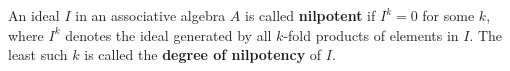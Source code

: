 An ideal $I$ in an associative algebra $A$ is called \textbf{nilpotent} if $I^k = 0$ for some $k$, where $I^k$ denotes the ideal generated by all $k$-fold products of elements in $I$. The least such $k$ is called the \textbf{degree of nilpotency} of $I$.
